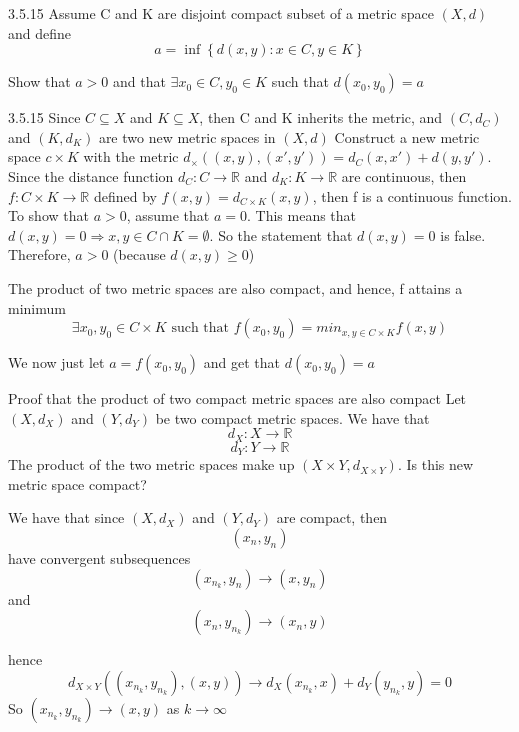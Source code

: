 \documentclass[a4paper,norsk]{article}
\renewcommand{\geq}{\geqslant}
\begin{document}
\begin{oppgavebox}{3.5.15}{}
Assume C and K are disjoint compact subset of a metric space $ \left( X, d \right)  $ and define
\[
    a = \inf \left\{ d \left( x, y \right) : x \in C, y \in K \right\} 
\]

Show that $ a > 0 $ and that $ \exists x_0 \in C, y_0 \in K $  such that $ d \left( x_0, y_0 \right) =a $

\begin{proofbox}{3.5.15}{}
  Since $ C \subseteq X $ and $ K \subseteq X $, then C and K inherits the metric, and $ \left( C, d_C \right)  $ and $ \left( K, d_K \right)  $ are two new metric spaces in $ \left( X, d \right)  $ 
  Construct a new metric space $ c \times K $ with the metric $ d_{\times} \left( \left( x, y \right) , \left( x', y' \right)  \right) = d_C \left( x, x' \right) + d \left( y, y' \right)   $. Since the distance function $ d_C : C \rightarrow \mathbb{R} $ and $ d_K : K \rightarrow \mathbb{R} $  are continuous, then $ f : C \times K \rightarrow \mathbb{R} $ defined by $ f(x,y) = d_{C \times K}(x,y) $, then f is a continuous function. To show that $ a > 0 $, assume that $ a = 0 $. This means that $ d(x,y) = 0 \Rightarrow x,y \in C \cap K = \emptyset $. So the statement that $ d \left( x, y \right) = 0 $ is false. Therefore, $ a > 0 $ (because $ d \left( x, y \right) \geq 0 $)    
  
  
  
  The product of two metric spaces are also compact, and hence, f attains a minimum
  \[
      \exists x_0, y_0 \in C \times K \text{ such that } f \left( x_0, y_0 \right) = min_{x, y \in C \times K} f(x, y)
  \]
   
  We now just let $ a = f \left( x_0, y_0 \right)  $ and get that $ d \left( x_0, y_0 \right) = a $ 

\end{proofbox}


\begin{proofbox}{Proof that the product of two compact metric spaces are also compact}{}
  Let $ \left( X, d_X \right)  $ and $ \left( Y, d_Y \right)  $ be two compact metric spaces. We have that  
  \[
      d_X : X \rightarrow \mathbb{R}
  \]
  \[
      d_Y : Y \rightarrow \mathbb{R}
  \]
  The product of the two metric spaces make up $ \left( X \times Y, d_{X \times Y} \right)  $. Is this new metric space compact?

  We have that since $ \left( X,d_X \right)  $ and $ \left( Y, d_Y \right)  $ are compact, then
  \[
      \left( x_n, y_n \right) 
  \]
  have convergent subsequences
  \[
      \left( x_{n_k}, y_n \right) \to \left( x, y_n \right) 
  \]
  and
  \[
      \left( x_n, y_{n_k} \right) \to \left( x_n, y \right) 
  \]

  hence
  \[
      d_{X \times Y} \left( \left( x_{n_k}, y_{n_k} \right), \left( x, y \right)  \right)  \to d_X \left( x_{n_k}, x \right) + d_Y \left( y_{n_k}, y \right) = 0
  \]
  So $\left( x_{n_k}, y_{n_k} \right) \to \left( x, y \right) $ as $ k \to \infty $ 
  
\end{proofbox}
\end{oppgavebox}
\end{document}
